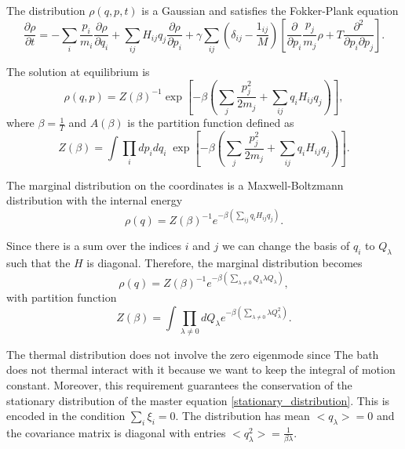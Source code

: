The distribution $\rho(q,p,t)$ is a Gaussian and satisfies the Fokker-Plank equation
\begin{equation}
    \frac{\partial\rho}{\partial t} = -\sum_i \frac{p_i}{m_i}\frac{\partial \rho}{\partial q_i} + \sum_{ij} H_{ij}q_j\frac{\partial \rho}{\partial p_i} + \gamma\sum_{ij}\left(\delta_{ij}-\frac{1_{ij}}{M}\right)\left[\frac{\partial}{\partial p_i}\frac{p_j}{m_j}\rho + T \frac{\partial^2}{\partial p_i \partial p_j}\right].
\end{equation}

The solution at equilibrium is
\begin{equation}
    \rho(q,p) = Z(\beta)^{-1} \exp\left[ -\beta \left( \sum_j \frac{p_j^2}{2m_j} + \sum_{ij} q_iH_{ij}q_j\right)\right],
\end{equation}
where $\beta = \frac{1}{T}$ and $A(\beta)$ is the partition function defined as
\begin{equation}
    Z(\beta) = \int \prod_i dp_i dq_i \; \exp\left[ -\beta \left( \sum_j \frac{p_j^2}{2m_j} + \sum_{ij} q_iH_{ij}q_j\right)\right].
\end{equation}

The marginal distribution on the coordinates is a Maxwell-Boltzmann distribution with the internal energy 
\begin{equation}
    \rho(q) = Z(\beta)^{-1} e^{-\beta \left(\sum_{ij} q_iH_{ij}q_j\right)}.
\end{equation}

Since there is a sum over the indices $i$ and $j$ we can change the basis of $q_i$ to $Q_\lambda$ such that the $H$ is diagonal. Therefore, the marginal distribution becomes
\begin{equation}\label{marginal_probability}
    \rho(q) = Z(\beta)^{-1} e^{-\beta \left(\sum_{\lambda \neq 0} Q_\lambda \lambda Q_\lambda\right)},
\end{equation}
with partition function 
\begin{equation}
    Z(\beta) = \int \prod_{\lambda\neq 0} dQ_\lambda e^{-\beta \left(\sum_{\lambda \neq 0} \lambda Q_\lambda^2\right)}.
\end{equation}

The thermal distribution does not involve the zero eigenmode since The bath does not thermal interact with it because we want to keep the integral of motion constant. Moreover, this requirement guarantees the conservation of the stationary distribution of the master equation \ref{stationary_distribution}.  
This is encoded in the condition $\sum_i \xi_i = 0$.
The distribution has mean $<q_\lambda>= 0$ and the covariance matrix is diagonal with entries $<q^2_\lambda>= \frac{1}{\beta \lambda}$.

